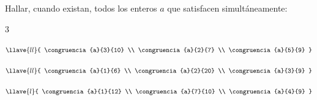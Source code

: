 \begin{enunciado}{\ejercicio}
  Hallar, cuando existan, todos los enteros $a$ que satisfacen simultáneamente:

  \begin{enumerate}[label=\roman*)]
    \begin{multicols}{3}
      \item
      $
        \llave{ll}{
          \congruencia{a}{3}{10} \\
          \congruencia{a}{2}{7}  \\
          \congruencia{a}{5}{9}
        }
      $
      \item
      $
        \llave{ll}{
          \congruencia{a}{1}{6}  \\
          \congruencia{a}{2}{20} \\
          \congruencia{a}{3}{9}
        }
      $

      \item $
        \llave{l}{
          \congruencia{a}{1}{12} \\
          \congruencia{a}{7}{10} \\
          \congruencia{a}{4}{9}
        }
      $
    \end{multicols}
  \end{enumerate}

\end{enunciado}

